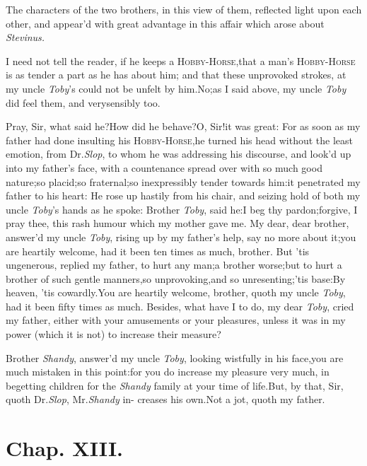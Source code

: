 \documentclass{article}
\begin{document}
The characters of the two brothers, in this view of them,
reflected light upon each other, and appear’d with great advantage
in this affair which arose about \textit{Stevinus.}

I need not tell the reader, if he keeps a
\textsc{Hobby-Horse},\tsk that a man’s
\textsc{Hobby-Horse} is as tender a part as he
has about him; and that these unprovoked strokes, at my uncle
\textit{Toby}’s could not be unfelt by
him.\tsh No;\tsk as I said above, my uncle
\textit{Toby} did feel them, and very\break sensibly too.

\newpage
Pray, Sir, what said he?\tsk How did he behave?\tsk O,
Sir!\tsk it was great: For as soon as my father had done insulting his
\textsc{Hobby-Horse},\tsh he turned
his head without the least emotion, from Dr.\@ \textit{Slop}, to whom
he was addressing his discourse, and look’d up into my
father’s face, with a countenance spread over with so much
good nature;\tsh so placid;\tsh so
fraternal;\tsk so inexpressibly tender towards
him:\tsk it penetrated my father to his heart: He rose up hastily
from his chair, and seizing hold of both my uncle
\textit{Toby}’s hands as he spoke:\tsh\break
Brother \textit{Toby}, said he:\tsk I beg thy pardon;\tsk forgive, I pray thee,
this rash humour which my mother gave me.\tsh\break
My dear, dear brother, answer’d my uncle \textit{Toby}, rising up by my
father’s help, say no more about it;\tsk you are heartily
welcome, had it been ten times as much,\pb
brother. But ’tis
ungenerous, replied my father, to hurt any man;\tsh a
brother worse;\tsk but to hurt a brother of such gentle
manners,\tsk so unprovoking,\tsk and so
unresenting;\tsk ’tis base:\tsk By heaven,
’tis cowardly.\tsh You are heartily welcome, brother, quoth
my uncle \textit{Toby},\tsk\break
had it been fifty times as much.\tsh\break
Besides, what have I to do, my
dear \textit{Toby}, cried my father, either with your amusements or
your pleasures, unless it was in my power (which it is not) to
increase\break
their measure?

\tsk Brother \textit{Shandy}, answer’d my uncle
\textit{Toby}, looking wistfully in his face,\tsk you are
much mistaken in this point:\tsk for you do increase my pleasure
very much, in begetting children for the \textit{Shandy} family at
your time of life.\tsh But, by that, Sir, quoth Dr.\@ \textit{Slop},
Mr.\@ \textit{Shandy} in-\pb
creases his own.\tsh Not a jot, quoth\break
my father.

\bigskip

\section{Chap. XIII.}
\end{document}

